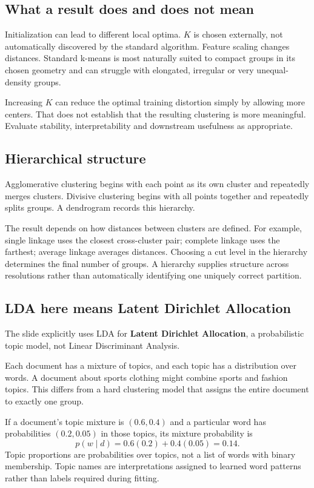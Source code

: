 \documentclass[11pt]{article}
\begin{document}
\subsection{What a result does and does not mean}
Initialization can lead to different local optima. $K$ is chosen externally, not automatically discovered by the standard algorithm. Feature scaling changes distances. Standard k-means is most naturally suited to compact groups in its chosen geometry and can struggle with elongated, irregular or very unequal-density groups.

Increasing $K$ can reduce the optimal training distortion simply by allowing more centers. That does not establish that the resulting clustering is more meaningful. Evaluate stability, interpretability and downstream usefulness as appropriate.

\subsection{Hierarchical structure}
Agglomerative clustering begins with each point as its own cluster and repeatedly merges clusters. Divisive clustering begins with all points together and repeatedly splits groups. A dendrogram records this hierarchy.

The result depends on how distances between clusters are defined. For example, single linkage uses the closest cross-cluster pair; complete linkage uses the farthest; average linkage averages distances. Choosing a cut level in the hierarchy determines the final number of groups. A hierarchy supplies structure across resolutions rather than automatically identifying one uniquely correct partition.

\subsection{LDA here means Latent Dirichlet Allocation}
The slide explicitly uses LDA for \textbf{Latent Dirichlet Allocation}, a probabilistic topic model, not Linear Discriminant Analysis.

Each document has a mixture of topics, and each topic has a distribution over words. A document about sports clothing might combine sports and fashion topics. This differs from a hard clustering model that assigns the entire document to exactly one group.

If a document's topic mixture is $(0.6,0.4)$ and a particular word has probabilities $(0.2,0.05)$ in those topics, its mixture probability is
\[
p(w\mid d)=0.6(0.2)+0.4(0.05)=0.14.
\]
Topic proportions are probabilities over topics, not a list of words with binary membership. Topic names are interpretations assigned to learned word patterns rather than labels required during fitting.
\end{document}
